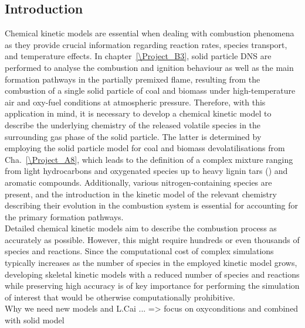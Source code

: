 \begin{refsection}
\section{Introduction} 
Chemical kinetic models are essential when dealing with combustion phenomena as they provide crucial information regarding reaction rates, species transport, and temperature effects. In chapter~\ref{\Project_B3}, solid particle DNS are performed to analyse the combustion and ignition behaviour as well as the main  formation pathways in the partially premixed flame, resulting from the combustion of a single solid particle of coal and biomass under high-temperature air and oxy-fuel conditions at atmospheric pressure. Therefore, with this application in mind, it is necessary to develop a chemical kinetic model to describe the underlying chemistry of the released volatile species in the surrounding gas phase of the solid particle. The latter is determined by employing the solid particle model for coal and biomass devolatilisations from Cha.~\ref{\Project_A8}, which leads to the definition of a complex mixture ranging from light hydrocarbons and oxygenated species up to heavy lignin tars () and aromatic compounds. Additionally, various nitrogen-containing species are present, and the introduction in the kinetic model of the relevant chemistry describing their evolution in the combustion system is essential for accounting for the primary  formation pathways.
\\
Detailed chemical kinetic models aim to describe the combustion process as accurately as possible. However, this might require hundreds or even thousands of species and reactions. Since the computational cost of complex simulations typically increases as the number of species in the employed kinetic model grows, developing skeletal kinetic models with a reduced number of species and reactions while preserving high accuracy is of key importance for performing the simulation of interest that would be otherwise computationally prohibitive.
\\
Why we need new models and L.Cai ... => focus on oxyconditions and combined with solid model
 




\end{refsection}
